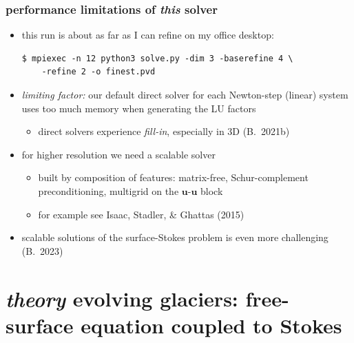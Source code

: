 \documentclass[10pt,
               hyperref={colorlinks,citecolor=DeepPink4,linkcolor=black,urlcolor=blue},
               svgnames]{beamer}
\newcommand{\bu}{\mathbf{u}}
\begin{document}
\begin{frame}[fragile]
\frametitle{performance limitations of \emph{this} solver}

\begin{itemize}
\item this run is about as far as I can refine on my office desktop:

\begin{Verbatim}[fontsize=\small]
$ mpiexec -n 12 python3 solve.py -dim 3 -baserefine 4 \
    -refine 2 -o finest.pvd
\end{Verbatim}

\item \emph{limiting factor:} our default \alert{direct solver} for each Newton-step (linear) system uses too much memory when generating the LU factors
    \begin{itemize}
    \item[$\circ$] direct solvers experience \emph{fill-in}, especially in 3D (B.~2021b)
    \end{itemize}

\pause
\item for higher resolution we need a \alert{scalable solver}
    \begin{itemize}
    \item[$\circ$] built by composition of features: matrix-free, Schur-complement preconditioning, multigrid on the $\bu$-$\bu$ block
    \item[$\circ$] for example see Isaac, Stadler, \& Ghattas (2015)
    \end{itemize}
\item scalable solutions of the \alert{surface-Stokes} problem is even more challenging (B.~2023)
\end{itemize}
\end{frame}


\section{\emph{theory} \hspace{11mm} evolving glaciers: free-surface equation coupled to Stokes}
\end{document}
